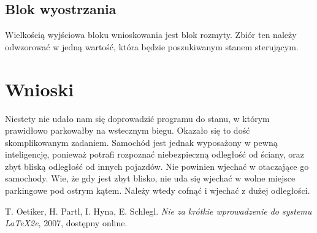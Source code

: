 \documentclass{classrep}
\begin{document}
\subsection{Blok wyostrzania}
Wielkością wyjściowa bloku wnioskowania jest blok rozmyty. Zbiór ten
należy odwzorować w jedną wartość, która będzie poszukiwanym stanem
sterującym.

\clearpage

\section{Wnioski}
  Niestety nie udało nam się doprowadzić programu do stanu, w którym prawidłowo parkowałby na wstecznym biegu. Okazało się to dość skomplikowanym zadaniem. Samochód jest jednak wyposażony w pewną inteligencję, ponieważ potrafi rozpoznać niebezpieczną odległość od ściany, oraz zbyt bliską odległość od innych pojazdów. Nie powinien wjechać w otaczające go samochody. Wie, że gdy jest zbyt blisko, nie uda się wjechać w wolne miejsce parkingowe pod ostrym kątem. Należy wtedy cofnąć i wjechać z dużej odległości.



\begin{thebibliography}{0}
   T. Oetiker, H. Partl, I. Hyna, E. Schlegl.
    \textsl{Nie za krótkie wprowadzenie do systemu \LaTeX2e}, 2007, dostępny
    online.
\end{thebibliography}
\end{document}
